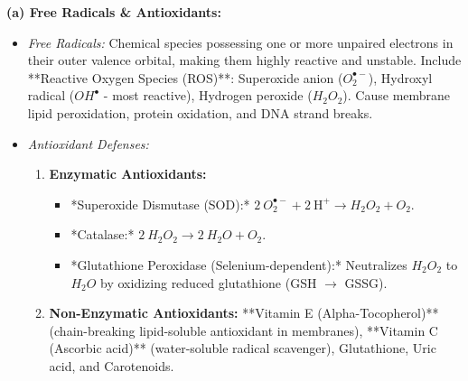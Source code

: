 \documentclass[11pt,a4paper]{article}
\begin{document}
\begin{ansbox}
\textbf{(a) Free Radicals & Antioxidants:}
\begin{itemize}[leftmargin=*]
    \item \textit{Free Radicals:} Chemical species possessing one or more unpaired electrons in their outer valence orbital, making them highly reactive and unstable. Include **Reactive Oxygen Species (ROS)**: Superoxide anion ($O_2^{\bullet-}$), Hydroxyl radical ($OH^{\bullet}$ - most reactive), Hydrogen peroxide ($H_2O_2$). Cause membrane lipid peroxidation, protein oxidation, and DNA strand breaks.
    \item \textit{Antioxidant Defenses:}
    \begin{enumerate}
        \item \textbf{Enzymatic Antioxidants:}
        \begin{itemize}
            \item *Superoxide Dismutase (SOD):* $2\ O_2^{\bullet-} + 2\ \text{H}^+ \rightarrow H_2O_2 + O_2$.
            \item *Catalase:* $2\ H_2O_2 \rightarrow 2\ H_2O + O_2$.
            \item *Glutathione Peroxidase (Selenium-dependent):* Neutralizes $H_2O_2$ to $H_2O$ by oxidizing reduced glutathione (GSH $\rightarrow$ GSSG).
        \end{itemize}
        \item \textbf{Non-Enzymatic Antioxidants:} **Vitamin E (Alpha-Tocopherol)** (chain-breaking lipid-soluble antioxidant in membranes), **Vitamin C (Ascorbic acid)** (water-soluble radical scavenger), Glutathione, Uric acid, and Carotenoids.
    \end{enumerate}
\end{itemize}


\end{ansbox}
\end{document}
